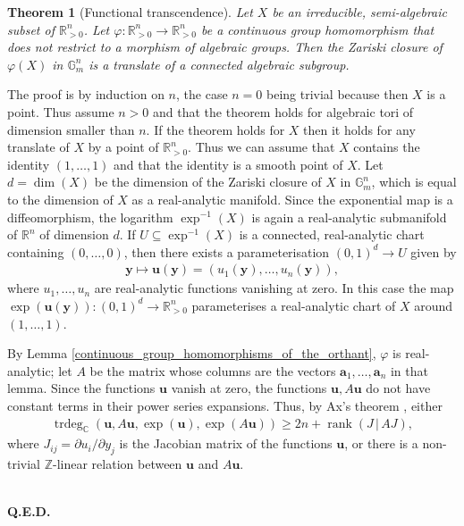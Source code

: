 \documentclass[9pt]{amsart}
\theoremstyle{my_theorem_style}
\numberwithin{definition}{section}
\newtheorem{theorem}[definition]{Theorem}
\renewenvironment{proof}{\noindent {\textbf{Proof.}}}{\\\textbf{Q.E.D.}}
\newcommand{\C}{\mathbb{C}}
\newcommand{\G}{\mathbb{G}}
\renewcommand{\phi}{\varphi}
\DeclareMathOperator{\rank}{rank}
\newcommand{\R}{\mathbb{R}}
\DeclareMathOperator{\trdeg}{trdeg}
\renewcommand{\vec}[1]{\bm{#1}}
\newcommand{\Z}{\mathbb{Z}}
\begin{document}
\begin{theorem}
[Functional transcendence]
\label{functional_transcendence_theorem}
    Let $X$ be an irreducible, semi-algebraic subset of $\R_{>0}^n$. Let $\phi : \R_{>0}^n \to \R_{>0}^n$ be a continuous group homomorphism that does not restrict to a morphism of algebraic groups. Then the Zariski closure of $\phi(X)$ in $\G_m^n$ is a translate of a connected algebraic subgroup.
\end{theorem}
\begin{proof}
    The proof is by induction on $n$, the case $n = 0$ being trivial because then $X$ is a point. Thus assume $n > 0$ and that the theorem holds for algebraic tori of dimension smaller than $n$. If the theorem holds for $X$ then it holds for any translate of $X$ by a point of $\R_{>0}^n$. Thus we can assume that $X$ contains the identity $(1, \dots, 1)$ and that the identity is a smooth point of $X$. Let $d = \dim(X)$ be the dimension of the Zariski closure of $X$ in $\G_m^n$, which is equal to the dimension of $X$ as a real-analytic manifold. Since the exponential map is a diffeomorphism, the logarithm $\exp^{-1}(X)$ is again a real-analytic submanifold of $\R^n$ of dimension $d$. If $U \subseteq \exp^{-1}(X)$ is a connected, real-analytic chart containing $(0, \dots, 0)$, then there exists a parameterisation $(0, 1)^d \to U$ given by
    \begin{align*}
        \vec{y} \mapsto \vec{u}(\vec{y}) = (u_1(\vec{y}), \dots, u_n(\vec{y})),
    \end{align*}
    where $u_1, \dots, u_n$ are real-analytic functions vanishing at zero. In this case the map $\exp(\vec{u}(\vec{y})) : (0, 1)^d \to \R_{>0}^n$ parameterises a real-analytic chart of $X$ around $(1, \dots, 1)$.

    By Lemma \ref{continuous_group_homomorphisms_of_the_orthant}, $\phi$ is real-analytic; let $A$ be the matrix whose columns are the vectors $\vec{a}_1, \dots, \vec{a}_n$ in that lemma. Since the functions $\vec{u}$ vanish at zero, the functions $\vec{u}, A \vec{u}$ do not have constant terms in their power series expansions. Thus, by Ax's theorem \cite[Theorem 3]{Ax_on_Schanuel's_conjectures}, either
    \begin{align*}
        \trdeg_\C(\vec{u}, A\vec{u}, \exp(\vec{u}), \exp(A\vec{u})) \geq 2n + 
        \rank(J \, | \, A J),
    \end{align*}
    where $J_{ij} = \partial u_i/\partial y_j$ is the Jacobian matrix of the functions $\vec{u}$, or there is a non-trivial $\Z$-linear relation between $\vec{u}$ and $A\vec{u}$.


\end{proof}
\end{document}
